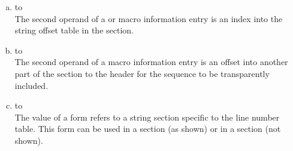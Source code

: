 \begin{enumerate}[(a)]
\item \dotdebugmacro{} to \dotdebugstroffsets \\
The second operand of a 
\DWMACROdefineindirectx{} or \DWMACROundefindirectx{} 
macro information entry is an index
into the string offset table in the 
\dotdebugstroffsets{} section.

\item \dotdebugmacro{} to \dotdebugmacro \\
The second operand of a 
\DWMACROtransparentinclude{} macro information
entry is an offset into another part of the 
\dotdebugmacro{} section to the header for the 
sequence to be transparently included.

\item \dotdebugline{} to \dotdebuglinestr \\
The value of a \DWFORMlinestrp{} form refers to a
string section specific to the line number table.
This form can be used in a \dotdebugline{} section
(as shown) or in a \dotdebuginfo{} section (not shown).

\end{enumerate}
